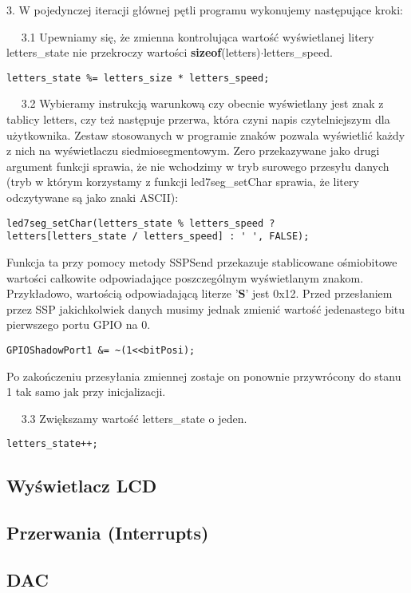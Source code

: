 \documentclass[a4paper,12pt,twoside]{article}
\theoremstyle{plain}
\theoremstyle{definition}
\theoremstyle{remark}
\begin{document}
3. W pojedynczej iteracji głównej pętli programu wykonujemy następujące kroki:

$\quad$ 3.1 Upewniamy się, że zmienna kontrolująca wartość wyświetlanej litery letters\_state nie przekroczy wartości \textbf{sizeof}(letters)$\cdot$letters\_speed.
\begin{verbatim}
letters_state %= letters_size * letters_speed;
\end{verbatim}

$\quad$ 3.2 Wybieramy instrukcją warunkową czy obecnie wyświetlany jest znak z tablicy letters, czy też następuje przerwa, która czyni napis czytelniejszym dla użytkownika. Zestaw stosowanych w programie znaków pozwala wyświetlić każdy z nich na wyświetlaczu siedmiosegmentowym. Zero przekazywane jako drugi argument funkcji sprawia, że nie wchodzimy w tryb surowego przesyłu danych (tryb w którym korzystamy z funkcji led7seg\_setChar sprawia, że litery odczytywane są jako znaki ASCII):
\begin{verbatim}
led7seg_setChar(letters_state % letters_speed ?
letters[letters_state / letters_speed] : ' ', FALSE);
\end{verbatim}
Funkcja ta przy pomocy metody SSPSend przekazuje stablicowane ośmiobitowe wartości całkowite odpowiadające poszczególnym wyświetlanym znakom. Przykładowo, wartością odpowiadającą literze '\textbf{S}' jest 0x12. Przed przesłaniem przez SSP jakichkolwiek danych musimy jednak zmienić wartość jedenastego bitu pierwszego portu GPIO na 0. 
\begin{verbatim}
GPIOShadowPort1 &= ~(1<<bitPosi);
\end{verbatim}
Po zakończeniu przesyłania zmiennej zostaje on ponownie przywrócony do stanu 1 tak samo jak przy inicjalizacji.

$\quad$ 3.3 Zwiększamy wartość letters\_state o jeden.
\begin{verbatim}
letters_state++;
\end{verbatim}
\subsection{Wyświetlacz LCD}

\subsection{Przerwania (Interrupts)}

\subsection{DAC}
\end{document}
